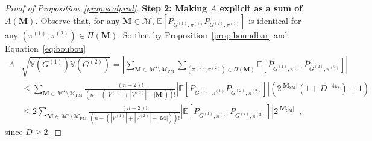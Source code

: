 \documentclass[final]{colt2026}
\newcommand{\1}{\mathbf{1}}
\newcommand{\pa}[1]{\left(#1\right)}
\begin{document}
\begin{proof}[Proof of Proposition~\ref{prop:scalprod}]
\noindent
{\bf Step  2: Making $A$ explicit as a sum of $A(\mathbf M)$.} Observe that, for any $\mathbf M \in \mathcal M$,  $\mathbb{E}\left[P_{G^{(1)}, \pi^{(1)}}P_{G^{(2)}, \pi^{(2)}}\right]$ is identical for any $(\pi^{(1)}, \pi^{(2)})\in \Pi(\mathbf{M})$. So that by Proposition~\ref{prop:boundbar} and Equation~\eqref{eq:boubou}
\begin{align}
    A&{\sqrt{\mathbb{V}(G^{(1)})\mathbb{V}(G^{(2)})}} = \left|\sum_{\mathbf{M}\in\mathcal{M}^{\star}\setminus \mathcal{M}_{\mathrm{PM}}}\sum_{(\pi^{(1)}, \pi^{(2)})\in \Pi(\mathbf{M})}\mathbb{E}\left[\overline{P}_{G^{(1)}, \pi^{(1)}}\overline{P}_{G^{(2)}, \pi^{(2)}}\right]\right|\nonumber\\
    &\leq %
    \sum_{\mathbf{M}\in\mathcal{M}^{\star}\setminus \mathcal{M}_{\mathrm{PM}}}\frac{(n-2)!}{\left(n-(|V^{(1)}|+ |V^{(2)}| - |\mathbf M|)\right)!}\left|\mathbb{E}\left[P_{G^{(1)}, \pi^{(1)}}P_{G^{(2)}, \pi^{(2)}}\right]\right| \pa{2^{|\mathbf M_{\mathrm{SM}}|}(1+D^{-4\texttt{c}_s})+1}\nonumber \\
    &\leq 2%
    \sum_{\mathbf{M}\in\mathcal{M}^{\star}\setminus \mathcal{M}_{\mathrm{PM}}}\frac{(n-2)!}{\left(n-(|V^{(1)}|+ |V^{(2)}| - |\mathbf M|)\right)!}\left|\mathbb{E}\left[P_{G^{(1)}, \pi^{(1)}}P_{G^{(2)}, \pi^{(2)}}\right]\right|2^{|\mathbf M_{\mathrm{SM}}|}\enspace ,\nonumber
    \end{align}
since $D\geq 2$.
    

\end{proof}
\end{document}
